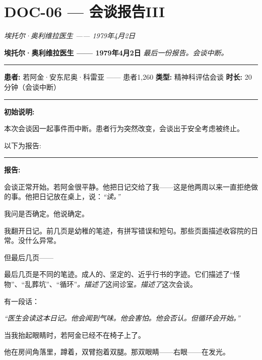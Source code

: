 \section*{\textbf{DOC-06} --- 会谈报告III}

\noindent \textit{埃托尔·奥利维拉医生 —— 1979年4月2日}

\noindent \textbf{埃托尔·奥利维拉医生 —— 1979年4月2日}
\textit{最后一份报告。会谈中断。}

\vspace{0.5em}\noindent\rule{\textwidth}{0.5pt}\vspace{0.5em}

\noindent \textbf{患者:} 若阿金·安东尼奥·科雷亚 —— 患者1,260
\textbf{类型:} 精神科评估会谈
\textbf{时长:} 20分钟（会谈中断）

\vspace{0.5em}\noindent\rule{\textwidth}{0.5pt}\vspace{0.5em}

\noindent \textbf{初始说明:}

\noindent 本次会谈因一起事件而中断。患者行为突然改变，会谈出于安全考虑被终止。

\noindent 以下为报告:

\vspace{0.5em}\noindent\rule{\textwidth}{0.5pt}\vspace{0.5em}

\noindent \textbf{报告:}

\noindent 会谈正常开始。若阿金很平静。他把日记交给了我——这是他两周以来一直拒绝做的事。他把日记放在桌上，说：\textit{“读。”}

\noindent 我问是否确定。他说确定。

\noindent 我翻开日记。前几页是幼稚的笔迹，有拼写错误和短句。那些页面描述收容院的日常。没什么异常。

\noindent 但最后几页——

\noindent 最后几页是不同的笔迹。成人的、坚定的、近乎行书的字迹。它们描述了“怪物”、“乱葬坑”、“循环”\textit{。描述了}这间诊室\textit{。描述了}这次会谈。

\noindent 有一段话：

\noindent \textit{“医生会读这本日记。他会闻到气味。他会害怕。他会否认。但循环会开始。”}

\noindent 当我抬起眼睛时，若阿金已经不在椅子上了。

\noindent 他在房间角落里，蹲着，双臂抱着双腿。那双眼睛——右眼——在发光。

